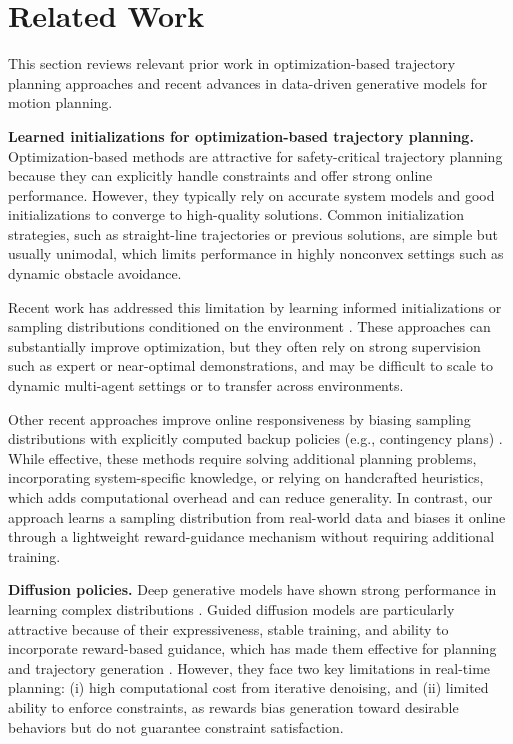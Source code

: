 \documentclass[letterpaper,10 pt,conference]{ieeeconf}
\begin{document}
\section{Related Work} \label{sec:related_work}
This section reviews relevant prior work in optimization-based trajectory planning approaches and recent advances in data-driven generative models for motion planning.


\noindent\textbf{Learned initializations for optimization-based trajectory planning.} 
Optimization-based methods are attractive for safety-critical trajectory planning because they can explicitly handle constraints and offer strong online performance. 
However, they typically rely on accurate system models and good initializations to converge to high-quality solutions. 
Common initialization strategies, such as straight-line trajectories or previous solutions, are simple but usually unimodal, which limits performance in highly nonconvex settings such as dynamic obstacle avoidance.

Recent work has addressed this limitation by learning informed initializations or sampling distributions conditioned on the environment \cite{SacksBoots2023,BanerjeeLewEtAl2020,GuffantiGammelliEtAl2024,HondaAkaiEtAl2023,PowerBerenson2024,LiBeeson2025,SharonyYangEtAl2025}. 
These approaches can substantially improve optimization, but they often rely on strong supervision such as expert or near-optimal demonstrations, and may be difficult to scale to dynamic multi-agent settings or to transfer across environments.

Other recent approaches improve online responsiveness by biasing sampling distributions with explicitly computed backup policies (e.g., contingency plans) \cite{TrevisanAlonsoMora2024,JungEstornellEtAl2025}. 
While effective, these methods require solving additional planning problems, incorporating system-specific knowledge, or relying on handcrafted heuristics, which adds computational overhead and can reduce generality.
In contrast, our approach learns a sampling distribution from real-world data and biases it online through a lightweight reward-guidance mechanism without requiring additional training.

\noindent\textbf{Diffusion policies.}
Deep generative models have shown strong performance in learning complex distributions \cite{KothariKreissEtAl2022,NieVahdatEtAl2021}.
Guided diffusion models \cite{SohlDicksteinWeissEtAl2015,HoJainEtAl2020,HoSalimans2021} are particularly attractive because of their expressiveness, stable training, and ability to incorporate reward-based guidance, which has made them effective for planning and trajectory generation \cite{ChiFengEtAl2023,JannerDuEtAl2022,CarvalhoLeEtAl2023,MengFan2024,ZhongRempeEtAl2023,XiaoWangEtAl2025}.
However, they face two key limitations in real-time planning: (i) high computational cost from iterative denoising, and (ii) limited ability to enforce constraints, as rewards bias generation toward desirable behaviors but do not guarantee constraint satisfaction. 
\end{document}

